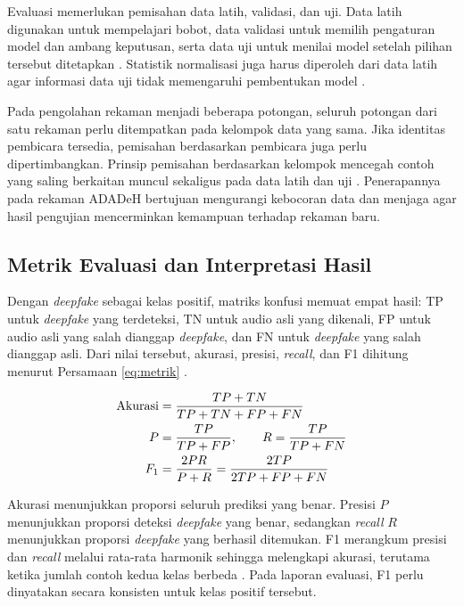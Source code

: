 Evaluasi memerlukan pemisahan data latih, validasi, dan uji. Data latih digunakan untuk mempelajari bobot, data validasi untuk memilih pengaturan model dan ambang keputusan, serta data uji untuk menilai model setelah pilihan tersebut ditetapkan \autocite{sklearn2026crossval}. Statistik normalisasi juga harus diperoleh dari data latih agar informasi data uji tidak memengaruhi pembentukan model \autocite{sklearn2026pitfalls}.

Pada pengolahan rekaman menjadi beberapa potongan, seluruh potongan dari satu rekaman perlu ditempatkan pada kelompok data yang sama. Jika identitas pembicara tersedia, pemisahan berdasarkan pembicara juga perlu dipertimbangkan. Prinsip pemisahan berdasarkan kelompok mencegah contoh yang saling berkaitan muncul sekaligus pada data latih dan uji \autocite{sklearn2026crossval}. Penerapannya pada rekaman ADADeH bertujuan mengurangi kebocoran data dan menjaga agar hasil pengujian mencerminkan kemampuan terhadap rekaman baru.

\subsection{Metrik Evaluasi dan Interpretasi Hasil}
\label{metrik}

Dengan \textit{deepfake} sebagai kelas positif, matriks konfusi memuat empat hasil: TP untuk \textit{deepfake} yang terdeteksi, TN untuk audio asli yang dikenali, FP untuk audio asli yang salah dianggap \textit{deepfake}, dan FN untuk \textit{deepfake} yang salah dianggap asli. Dari nilai tersebut, akurasi, presisi, \textit{recall}, dan F1 dihitung menurut Persamaan \ref{eq:metrik} \autocite{sklearn2026metrics}.

\begin{align}
  \text{Akurasi} &= \frac{TP + TN}{TP + TN + FP + FN} \notag \\
  P &= \frac{TP}{TP + FP}, \qquad R = \frac{TP}{TP + FN} \notag \\
  F_1 &= \frac{2PR}{P + R} = \frac{2TP}{2TP + FP + FN}
  \label{eq:metrik}
\end{align}

Akurasi menunjukkan proporsi seluruh prediksi yang benar. Presisi $P$ menunjukkan proporsi deteksi \textit{deepfake} yang benar, sedangkan \textit{recall} $R$ menunjukkan proporsi \textit{deepfake} yang berhasil ditemukan. F1 merangkum presisi dan \textit{recall} melalui rata-rata harmonik sehingga melengkapi akurasi, terutama ketika jumlah contoh kedua kelas berbeda \autocite{sklearn2026metrics}. Pada laporan evaluasi, F1 perlu dinyatakan secara konsisten untuk kelas positif tersebut.

